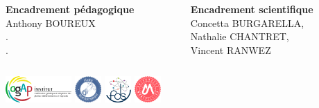\documentclass[../main]{subfiles} %
\begin{document}




\begin{frame}
  \titlepage
  \begin{columns}
        \scriptsize
        \begin{column}{0.5\textwidth}
            \flushleft
            \textbf{Encadrement pédagogique} \\
            Anthony BOUREUX \\ \tiny . \\ .

        \end{column}
        
        \scriptsize
        \begin{column}{0.5\textwidth}
            \flushright
            \textbf{Encadrement scientifique} \\
             Concetta BURGARELLA, \\
             Nathalie CHANTRET, \\
             Vincent RANWEZ

        \end{column}
        
    \end{columns}

    \begin{center}
        \includegraphics[height=1cm]{Logos/logo_agap.png}\hspace{0.2cm}
    	  \includegraphics[height=1cm]{Logos/logo_Bioinfo.png}\hspace{0.2cm}
    	  \includegraphics[height=1cm]{Logos/logo_fds_rond.png}\hspace{0.2cm}
    	  \includegraphics[height=1cm]{Logos/logo_UM.png}\hspace{0.2cm}
    \end{center}
\end{frame}
\end{document}

